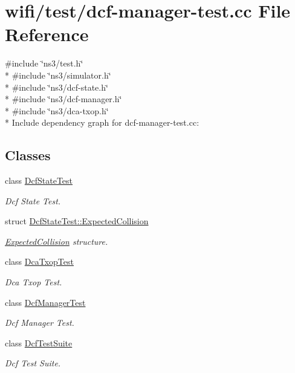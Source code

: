 \hypertarget{dcf-manager-test_8cc}{}\section{wifi/test/dcf-\/manager-\/test.cc File Reference}
\label{dcf-manager-test_8cc}
{\ttfamily \#include \char`\"{}ns3/test.\+h\char`\"{}}\\*
{\ttfamily \#include \char`\"{}ns3/simulator.\+h\char`\"{}}\\*
{\ttfamily \#include \char`\"{}ns3/dcf-\/state.\+h\char`\"{}}\\*
{\ttfamily \#include \char`\"{}ns3/dcf-\/manager.\+h\char`\"{}}\\*
{\ttfamily \#include \char`\"{}ns3/dca-\/txop.\+h\char`\"{}}\\*
Include dependency graph for dcf-\/manager-\/test.cc\+:
\subsection*{Classes}
\begin{DoxyCompactItemize}
\item 
class \hyperlink{classDcfStateTest}{Dcf\+State\+Test}
\begin{DoxyCompactList}\small\item\em Dcf State Test. \end{DoxyCompactList}\item 
struct \hyperlink{structDcfStateTest_1_1ExpectedCollision}{Dcf\+State\+Test\+::\+Expected\+Collision}
\begin{DoxyCompactList}\small\item\em \hyperlink{structDcfStateTest_1_1ExpectedCollision}{Expected\+Collision} structure. \end{DoxyCompactList}\item 
class \hyperlink{classDcaTxopTest}{Dca\+Txop\+Test}
\begin{DoxyCompactList}\small\item\em Dca Txop Test. \end{DoxyCompactList}\item 
class \hyperlink{classDcfManagerTest}{Dcf\+Manager\+Test}
\begin{DoxyCompactList}\small\item\em Dcf Manager Test. \end{DoxyCompactList}\item 
class \hyperlink{classDcfTestSuite}{Dcf\+Test\+Suite}
\begin{DoxyCompactList}\small\item\em Dcf Test Suite. \end{DoxyCompactList}\end{DoxyCompactItemize}
